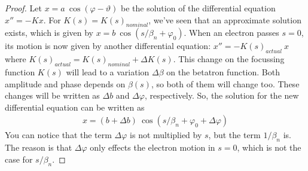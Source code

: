 \begin{proof}
	Let $x = a\ \cos(\varphi-\vartheta)$ be the solution of the differential equation $x'' = -Kx$. For $K(s) = K(s)_{nominal}$, we've seen that an approximate solution exists, which is given by $x = b\ \cos(s/\beta_n + \varphi_0)$. When an electron passes $s=0$, its motion is now given by another differential equation: $x'' = -K(s)_{actual}\ x$ where $K(s)_{actual} = K(s)_{nominal} + \Delta K(s)$. This change on the focussing function $K(s)$ will lead to a variation $\Delta \beta$ on the betatron function. Both amplitude and phase depends on $\beta(s)$, so both of them will change too. These changes will be written as $\Delta b$ and $\Delta \varphi$, respectively. So, the solution for the new differential equation can be written as
	\begin{align*}
		x = (b+\Delta b)\ \cos(s/\beta_n + \varphi_0 + \Delta \varphi)
	\end{align*}
	You can notice that the term $\Delta \varphi$ is not multiplied by $s$, but the term $1/\beta_n$ is. The reason is that $\Delta \varphi$ only effects the electron motion in $s=0$, which is not the case for $s/\beta_n$.


\end{proof}
